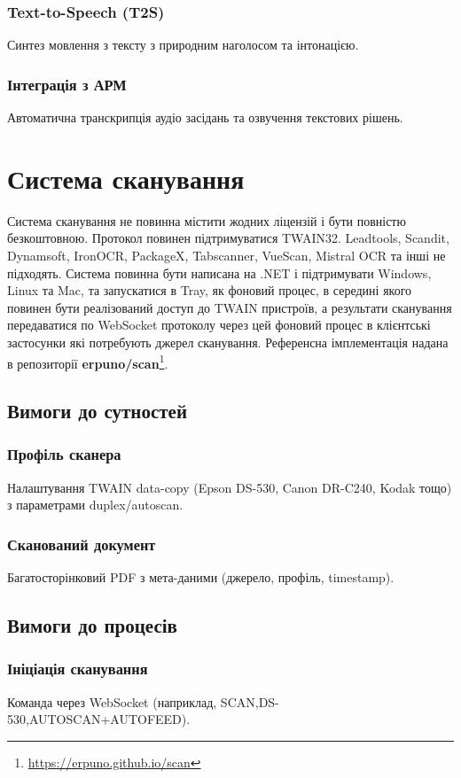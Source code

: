 \documentclass{article}
\begin{document}
\subsubsection{Text-to-Speech (T2S)}
Синтез мовлення з тексту з природним наголосом та інтонацією.

\subsubsection{Інтеграція з АРМ}
Автоматична транскрипція аудіо засідань та озвучення текстових рішень.

\newpage
\section{Система сканування}
Система сканування не повинна містити жодних ліцензій і бути повністю безкоштовною.
Протокол повинен підтримуватися TWAIN32. Leadtools, Scandit, Dynamsoft, IronOCR, PackageX, Tabscanner, VueScan, Mistral OCR та інші не підходять.
Система повинна бути написана на .NET і підтримувати Windows, Linux та Mac, та запускатися в Tray, як
фоновий процес, в середині якого повинен бути реалізований доступ до TWAIN пристроїв, а результати сканування
передаватися по WebSocket протоколу через цей фоновий процес в клієнтські застосунки які потребують джерел сканування.
Референсна імплементація надана в репозиторії \textbf{erpuno/scan}\footnote{\url{https://erpuno.github.io/scan}}.

\subsection{Вимоги до сутностей}
\subsubsection{Профіль сканера}
Налаштування TWAIN data-copy (Epson DS-530, Canon DR-C240, Kodak тощо) з параметрами duplex/autoscan.

\subsubsection{Сканований документ}
Багатосторінковий PDF з мета-даними (джерело, профіль, timestamp).

\subsection{Вимоги до процесів}
\subsubsection{Ініціація сканування}
Команда через WebSocket (наприклад, SCAN,DS-530,AUTOSCAN+AUTOFEED).
\end{document}
